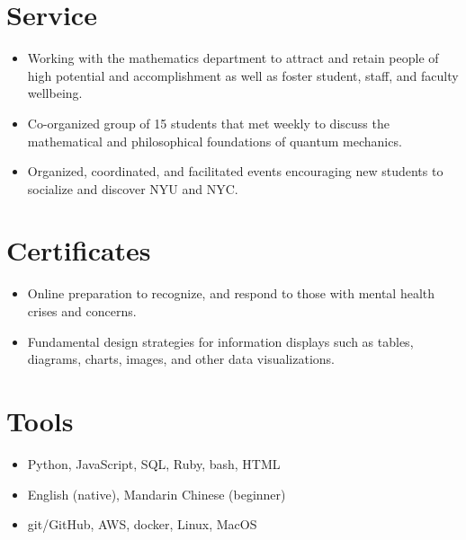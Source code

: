 \documentclass{cultvoucher}
\begin{document}
\section{Service}

\begin{itemize}
	\item Working with the mathematics department to attract and retain people of high potential and accomplishment as well as foster student, staff, and faculty wellbeing.
\end{itemize}

\begin{itemize}
	\item Co-organized group of 15 students that met weekly to discuss the mathematical and philosophical foundations of quantum mechanics.
\end{itemize}

\begin{itemize}
	\item Organized, coordinated, and facilitated events encouraging new students to socialize and discover NYU and NYC.
\end{itemize}

\section{Certificates}
\begin{itemize}
	\item Online preparation to recognize, and respond to those with mental health crises and concerns.
\end{itemize}
\begin{itemize}
	\item Fundamental design strategies for information displays such as tables, diagrams, charts, images, and other data visualizations.
\end{itemize}


\section{Tools}
\begin{itemize}
	\item Python, JavaScript, SQL, Ruby, bash, HTML
	\item English (native), Mandarin Chinese (beginner)
\end{itemize}
\begin{itemize}
	\item git/GitHub, AWS, docker, Linux, MacOS
\end{itemize}
\end{document}
